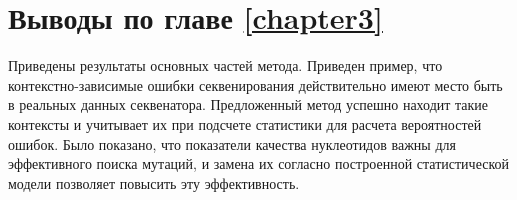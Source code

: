 \section{Выводы по главе \protect\ref{chapter3}}

Приведены результаты основных частей метода. Приведен пример, что контекстно-зависимые ошибки секвенирования действительно имеют место быть в реальных данных секвенатора. Предложенный метод успешно находит такие контексты и учитывает их при подсчете статистики для расчета вероятностей ошибок. Было показано, что показатели качества нуклеотидов важны для эффективного поиска мутаций, и замена их согласно построенной статистической модели позволяет повысить эту эффективность. 

